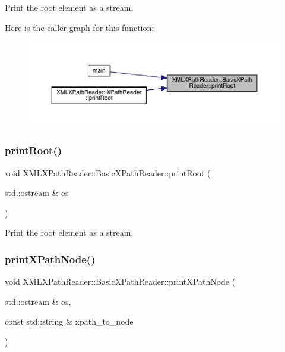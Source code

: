 Print the root element as a stream. 

Here is the caller graph for this function\+:
\nopagebreak
\begin{figure}[H]
\begin{center}
\leavevmode
\includegraphics[width=350pt]{d6/dbf/classXMLXPathReader_1_1BasicXPathReader_abc0bfad898a5b01d2251d7aaacbbb507_icgraph}
\end{center}
\end{figure}
\mbox{\label{classXMLXPathReader_1_1BasicXPathReader_abc0bfad898a5b01d2251d7aaacbbb507}} 
\subsubsection{\texorpdfstring{printRoot()}{printRoot()}\hspace{0.1cm}{\footnotesize\ttfamily [2/2]}}
{\footnotesize\ttfamily void X\+M\+L\+X\+Path\+Reader\+::\+Basic\+X\+Path\+Reader\+::print\+Root (\begin{DoxyParamCaption}\item[{std\+::ostream \&}]{os }\end{DoxyParamCaption})}



Print the root element as a stream. 

\mbox{\label{classXMLXPathReader_1_1BasicXPathReader_afba694dbda7c2e1c26ca344085bfffb6}} 
\subsubsection{\texorpdfstring{printXPathNode()}{printXPathNode()}\hspace{0.1cm}{\footnotesize\ttfamily [1/2]}}
{\footnotesize\ttfamily void X\+M\+L\+X\+Path\+Reader\+::\+Basic\+X\+Path\+Reader\+::print\+X\+Path\+Node (\begin{DoxyParamCaption}\item[{std\+::ostream \&}]{os,  }\item[{const std\+::string \&}]{xpath\+\_\+to\+\_\+node }\end{DoxyParamCaption})}



